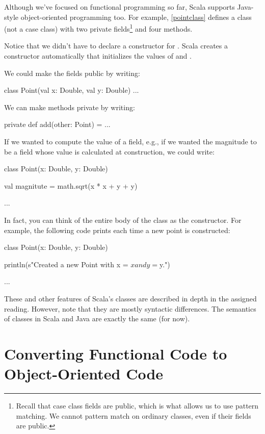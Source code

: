 \documentclass{book}
\begin{document}
Although we've focused on functional programming so far, Scala supports
Java-style object-oriented programming too. For example, \cref{pointclass}
defines a  class (not a case class) with two private
fields\footnote{Recall that case class fields are public, which
is what allows us to use pattern matching. We cannot pattern match on ordinary classes,
even if their fields are public.} and four methods.

Notice that we didn't have to declare a constructor for .
Scala creates a constructor automatically that initializes the values of
 and .

We could make the fields public by writing:
\begin{scalacode}
class Point(val x: Double, val y: Double) { ... }
\end{scalacode}

We can make methods private by writing:
\begin{scalacode}
private def add(other: Point) = { ... }
\end{scalacode}

If we wanted to compute the value of a field, e.g., if we wanted the magnitude
to be a field whose value is calculated at construction, we could write:
%
\begin{scalacode}
class Point(x: Double, y: Double) {

  val magnitute = math.sqrt(x * x + y + y)

  ...
}
\end{scalacode}

In fact, you can think of the entire body of the class as the constructor.
For example, the following code prints each time a new point is constructed:

%
\begin{scalacode}
class Point(x: Double, y: Double) {

  println(s"Created a new Point with x = $x and y = $y.")

  ...
}
\end{scalacode}

These and other features of Scala's classes are described in depth in the
assigned reading. However, note that they are mostly syntactic differences.
The semantics of classes in Scala and Java are exactly the same (for now).

\section{Converting Functional Code to Object-Oriented Code}
\end{document}
